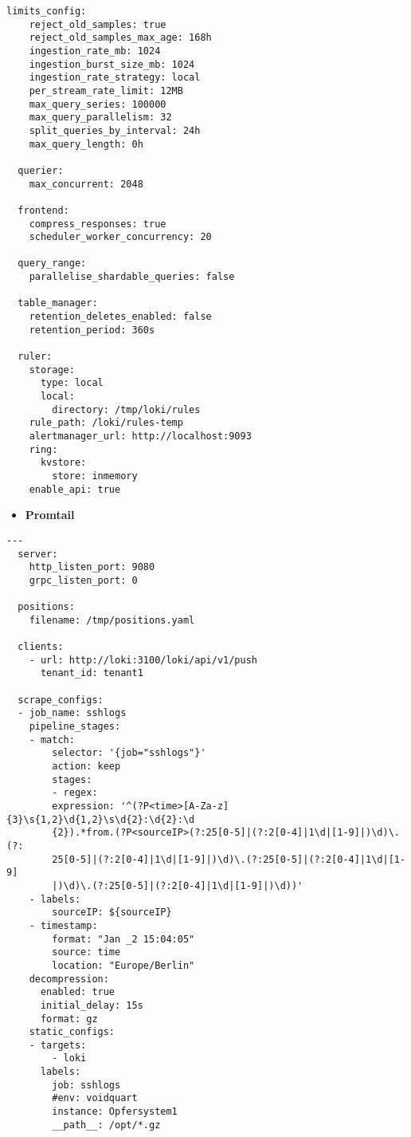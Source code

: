 {\begin{Verbatim}[frame=single]
  limits_config:
    reject_old_samples: true
    reject_old_samples_max_age: 168h
    ingestion_rate_mb: 1024
    ingestion_burst_size_mb: 1024
    ingestion_rate_strategy: local
    per_stream_rate_limit: 12MB
    max_query_series: 100000
    max_query_parallelism: 32
    split_queries_by_interval: 24h
    max_query_length: 0h
  
  querier:
    max_concurrent: 2048
  
  frontend:
    compress_responses: true
    scheduler_worker_concurrency: 20
  
  query_range:
    parallelise_shardable_queries: false
  
  table_manager:
    retention_deletes_enabled: false
    retention_period: 360s
  
  ruler:
    storage:
      type: local
      local:
        directory: /tmp/loki/rules
    rule_path: /loki/rules-temp
    alertmanager_url: http://localhost:9093
    ring:
      kvstore:
        store: inmemory
    enable_api: true
\end{Verbatim}
}

\begin{itemize}[noitemsep]
    \item \textbf{Promtail} 
\end{itemize}

{
\begin{Verbatim}[frame=single]
  ---
  server:
    http_listen_port: 9080
    grpc_listen_port: 0
  
  positions:
    filename: /tmp/positions.yaml
  
  clients:
    - url: http://loki:3100/loki/api/v1/push
      tenant_id: tenant1
  
  scrape_configs:
  - job_name: sshlogs
    pipeline_stages:
    - match:
        selector: '{job="sshlogs"}'
        action: keep
        stages:
        - regex:
        expression: '^(?P<time>[A-Za-z]{3}\s{1,2}\d{1,2}\s\d{2}:\d{2}:\d
        {2}).*from.(?P<sourceIP>(?:25[0-5]|(?:2[0-4]|1\d|[1-9]|)\d)\.(?:
        25[0-5]|(?:2[0-4]|1\d|[1-9]|)\d)\.(?:25[0-5]|(?:2[0-4]|1\d|[1-9]
        |)\d)\.(?:25[0-5]|(?:2[0-4]|1\d|[1-9]|)\d))'
    - labels:
        sourceIP: ${sourceIP}
    - timestamp:
        format: "Jan _2 15:04:05"
        source: time
        location: "Europe/Berlin"
    decompression:
      enabled: true
      initial_delay: 15s
      format: gz
    static_configs:
    - targets:
        - loki
      labels:
        job: sshlogs
        #env: voidquart
        instance: Opfersystem1
        __path__: /opt/*.gz
\end{Verbatim}
}

